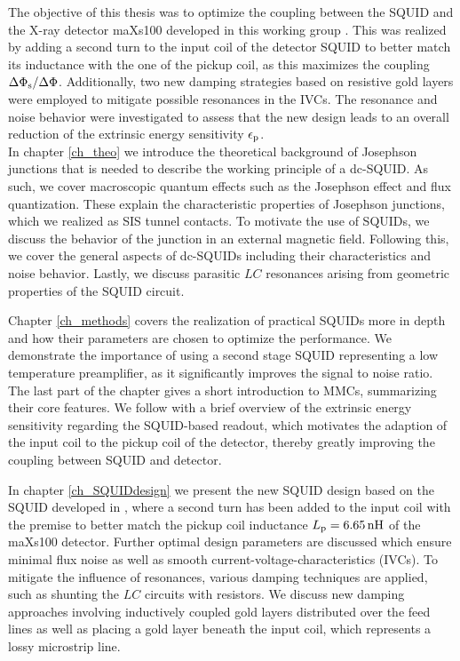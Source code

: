 The objective of this thesis was to optimize the coupling between the SQUID and the X-ray detector maXs100 developed in this working group \cite{Allgeier2024}. This was realized by adding a second turn to the input coil of the detector SQUID to better match its inductance with the one of the pickup coil, as this maximizes the coupling  $\Delta\Phi_{\rm s}/\Delta\Phi$. Additionally, two new damping strategies based on resistive gold layers were employed to mitigate possible resonances in the IVCs. The resonance and noise behavior were investigated to assess that the new design leads to an overall reduction of the extrinsic energy sensitivity $\epsilon_{\rm p}$. \\

In chapter \ref{ch_theo} we introduce the theoretical background of Josephson junctions that is needed to describe the working principle of a dc-SQUID. As such, we cover macroscopic quantum effects such as the Josephson effect and flux quantization. These explain the characteristic properties of Josephson junctions, which we realized as SIS tunnel contacts. To motivate the use of SQUIDs, we discuss the behavior of the junction in an external magnetic field. Following this, we cover the general aspects of dc-SQUIDs including their characteristics and noise behavior. Lastly, we discuss parasitic $LC$ resonances arising from geometric properties of the SQUID circuit.

Chapter \ref{ch_methods} covers the realization of practical SQUIDs more in depth and how their parameters are chosen to optimize the performance. We demonstrate the importance of using a second stage SQUID representing a low temperature preamplifier, as it significantly improves the signal to noise ratio. The last part of the chapter gives a short introduction to MMCs, summarizing their core features. We follow with a brief overview of the extrinsic energy sensitivity regarding the SQUID-based readout, which motivates the adaption of the input coil to the pickup coil of the detector, thereby greatly improving the coupling between SQUID and detector.   

In chapter \ref{ch_SQUIDdesign} we present the new SQUID design based on the SQUID developed in \cite{Bauer2022}, where a second turn has been added to the input coil with the premise to better match the pickup coil inductance $L_{\rm p}=\qty{6.65}{\nH}$ of the maXs100 detector. Further optimal design parameters are discussed which ensure minimal flux noise as well as smooth current-voltage-characteristics (IVCs). To mitigate the influence of resonances, various damping techniques are applied, such as shunting the $LC$ circuits with resistors. We discuss new damping approaches involving inductively coupled gold layers distributed over the feed lines as well as placing a gold layer beneath the input coil, which represents a lossy microstrip line.  

